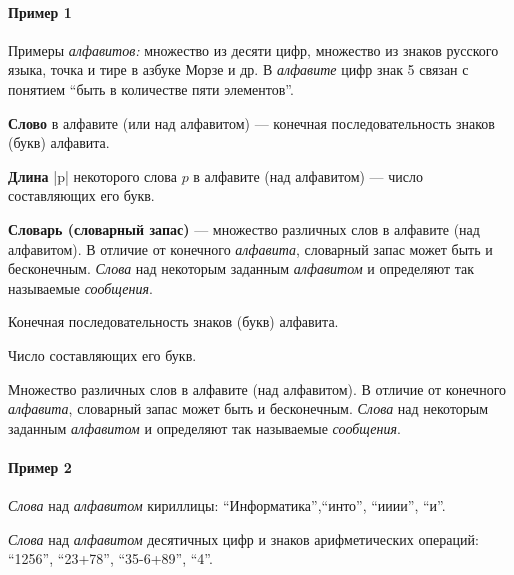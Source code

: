 \paragraph{Пример 1}

Примеры \emph{алфавитов:} множество из десяти цифр, множество из знаков русского языка, точка и тире в азбуке Морзе и др. В \emph{алфавите} цифр знак 5 связан с понятием \enquote{быть в количестве пяти элементов}.

\textbf{Слово} в алфавите (или над алфавитом) --- конечная последовательность знаков (букв) алфавита.

\textbf{Длина} |p| некоторого слова $p$ в алфавите (над алфавитом) --- число составляющих его букв.

\textbf{Словарь (словарный запас)} --- множество различных слов в алфавите (над алфавитом).
В отличие от конечного \emph{алфавита}, словарный запас может быть и бесконечным.
\emph{Слова} над некоторым заданным \emph{алфавитом} и определяют так называемые \emph{сообщения}.

\begin{description}[font=\normalfont\color{termcolor}]
    \item [\textbf{Слово} в алфавите (или над алфавитом)]
          Конечная последовательность знаков (букв) алфавита.

    \item [\textbf{Длина} |p| некоторого слова p в алфавите (над алфавитом)]
          Число составляющих его букв.

    \item [\textbf{Словарь (словарный запас)}]
          Множество различных слов в алфавите (над алфавитом).
          В отличие от конечного \emph{алфавита}, словарный запас может быть и бесконечным.
          \emph{Слова} над некоторым заданным \emph{алфавитом} и определяют так называемые \emph{сообщения}.
\end{description}

\paragraph{Пример 2}

\emph{Слова} над \emph{алфавитом} кириллицы: \enquote{Информатика},\enquote{инто}, \enquote{ииии}, \enquote{и}.

\noindent
\emph{Слова} над \emph{алфавитом} десятичных цифр и знаков арифметических операций: \enquote{1256}, \enquote{23+78}, \enquote{35-6+89}, \enquote{4}.

